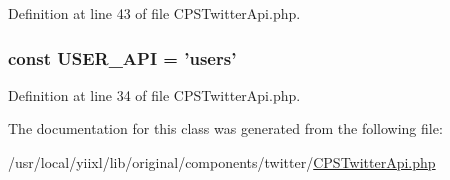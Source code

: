 Definition at line 43 of file CPSTwitterApi.php.

\hypertarget{classCPSTwitterApi_a7186266c619bf7c259df620a27a6be61}{
\subsubsection[{USER\_\-API}]{\setlength{\rightskip}{0pt plus 5cm}const {\bf USER\_\-API} = 'users'}}
\label{classCPSTwitterApi_a7186266c619bf7c259df620a27a6be61}


Definition at line 34 of file CPSTwitterApi.php.



The documentation for this class was generated from the following file:\begin{DoxyCompactItemize}
\item 
/usr/local/yiixl/lib/original/components/twitter/\hyperlink{CPSTwitterApi_8php}{CPSTwitterApi.php}\end{DoxyCompactItemize}
